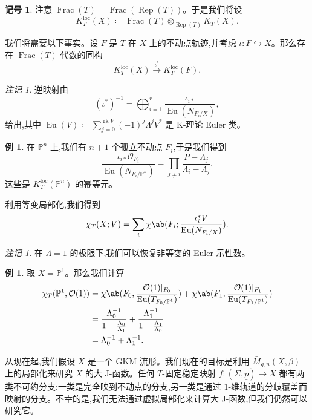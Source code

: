 \documentclass{amsart}
\theoremstyle{definition}
\newtheorem{exm}[thm]{例}
\newtheorem{notn}[thm]{记号}
\theoremstyle{remark}
\newtheorem{rmk}[thm]{注记}
\theoremstyle{plain}
\theoremstyle{definition}
\theoremstyle{remark}
\renewcommand{\P}{\mathbb{P}}
\newcommand{\mc}[1]{\mathcal{#1}}
\newcommand{\mr}[1]{\mathrm{#1}}
\newcommand{\on}[1]{\operatorname{#1}}
\newcommand{\ul}[1]{\underline{#1}}
\newcommand{\1}{\mathbf{1}}
\newcommand{\2}{\mathbf{2}}
\newcommand{\3}{\mathbf{3}}
\newcommand{\loc}{\mr{loc}}
\begin{document}
\begin{notn}
    注意 \(\on{Frac}(T) = \on{Frac}(\on{Rep}(T))\)。于是我们将设
    \[ K_T^{\loc}(X) \coloneqq \on{Frac}(T) \otimes_{\on{Rep}(T)} K_T(X). \]
\end{notn}

我们将需要以下事实。设 \(F\) 是 \(T\) 在 \(X\) 上的不动点轨迹,并考虑 \(\iota \colon F \hookrightarrow X\)。那么存在 \(\on{Frac}(T)\)-代数的同构
\[ K_T^{\loc}(X) \xrightarrow{\iota^*} K_T^{\loc}(F). \]

\begin{rmk}
    逆映射由
    \[ (\iota^*)^{-1} = \bigoplus_{i=1}^r \frac{\iota_{i*}}{\on{Eu}(N_{F_i/X})}, \]
    给出,其中 \(\on{Eu}(V) \coloneqq \sum_{j = 0}^{\on{rk} V} (-1)^j \Lambda^j V^*\) 是 K-理论 Euler 类。
\end{rmk}

\begin{exm}
    在 \(\P^n\) 上,我们有 \(n+1\) 个孤立不动点 \(F_i\),于是我们得到
    \[ \frac{\iota_{i*} \mc{O}_{F_i}}{\on{Eu}(N_{F_i/\P^n})} = \prod_{j \neq i} \frac{P - \Lambda_j}{\Lambda_i - \Lambda_j}. \]
    这些是 \(K_T^{\loc}(\P^n)\) 的幂等元。
\end{exm}

利用等变局部化,我们得到
\[ \chi_T(X; V) = \sum_i \chi\ab(F_i; \frac{\iota_i^* V}{\on{Eu}(N_{F_i/X})}). \]

\begin{rmk}
    在 \(\Lambda = 1\) 的极限下,我们可以恢复非等变的 Euler 示性数。
\end{rmk}

\begin{exm}
    取 \(X = \P^1\)。那么我们计算
    \begin{align*}
        \chi_T(\P^1, \mc{O}(1)) &= \chi\ab(F_0, \frac{\mc{O}(1)|_{F_0}}{\on{Eu}(T_{F_0/\P^1})}) + \chi\ab(F_1, \frac{\mc{O}(1)|_{F_1}}{\on{Eu}(T_{F_1/\P^1})}) \\
        &= \frac{\Lambda_0^{-1}}{1 - \frac{\Lambda_0}{\Lambda_1}} + \frac{\Lambda_1^{-1}}{1 - \frac{\Lambda_1}{\Lambda_0}} \\
        &= \Lambda_0^{-1} + \Lambda_1^{-1}.
    \end{align*}
\end{exm}

从现在起,我们假设 \(X\) 是一个 GKM 流形。我们现在的目标是利用 \(\bar{M}_{g,n}(X, \beta)\) 上的局部化来研究 \(X\) 的大 J-函数。任何 \(T\)-固定稳定映射 \(f \colon (\Sigma, \ul{p}) \to X\) 都有两类不可约分支:一类是完全映到不动点的分支,另一类是通过 \(1\)-维轨道的分歧覆盖而映射的分支。不幸的是,我们无法通过虚拟局部化来计算大 J-函数,但我们仍然可以研究它。
\end{document}
